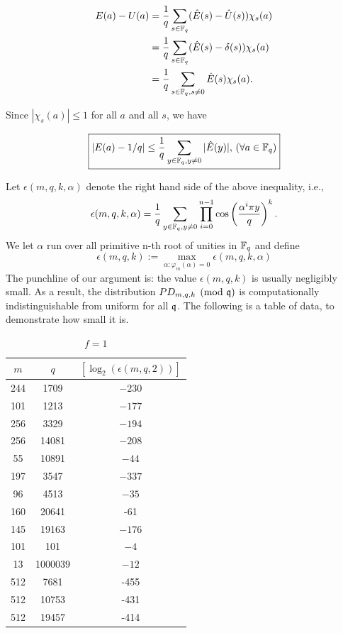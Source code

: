 \documentclass{amsart}
\begin{document}
\begin{align*}
    E(a) - U(a) &= \frac{1}{q} \sum_{s \in \mathbb{F}_q} (\hat{E}(s) - \hat{U}(s) )\chi_s(a) \\
& = \frac{1}{q} \sum_{s \in \mathbb{F}_q} (\hat{E}(s) - \delta(s) )\chi_s(a) \\
& = \frac{1}{q} \sum_{s \in \mathbb{F}_q, s \neq 0} \hat{E}(s) \chi_s(a).
\end{align*}

Since $|\chi_s(a)| \leq 1$ for all $a$ and all $s$, we have

\begin{Prop}
\[
    \boxed{|E(a) -  1/q| \leq \frac{1}{q}  \sum_{y \in \mathbb{F}_q, y \neq 0}  |\hat{E}(y)|, \, (\forall a \in \mathbb{F}_q)}
\]
\end{Prop}

Let $\epsilon(m,q,k,\alpha)$ denote the right hand side of the above inequality, i.e.,
\[
    \epsilon(m,q,k, \alpha) = \frac{1}{q}\sum_{y \in \mathbb{F}_q, y \neq 0} \prod_{i=0}^{n-1} \cos \left(\frac{ \alpha^i \pi y}{q} \right)^k.
\]
We let $\alpha$ run over all primitive n-th root of unities in $\mathbb{F}_q$ and define
$$\epsilon(m,q,k) := \max_{\alpha: \varphi_m(\alpha) = 0 } \epsilon(m,q,k,\alpha)$$
The punchline of our argument is: the value $\epsilon(m,q,k)$ is usually negligibly small. As a result, the distribution $PD_{m,q,k} \pmod {\mathfrak{q}}$ is computationally indistinguishable from uniform for all $\mathfrak{q}$. The following is a table of data, to demonstrate how small it is.

\FloatBarrier
\begin{table}[H]
\caption{$f = 1$}
\begin{tabular}{c|c|c}
$m$ & $q$ & $[\log_2(\epsilon(m,q, 2))]$ \\
\hline
244 & 1709 & $-230$ \\
101 & 1213 & $-177$ \\
256 & 3329 & $-194$ \\
256 & 14081 & $-208$ \\
55 & 10891  & $-44$ \\
197 & 3547 & $-337$ \\
96 & 4513 & $-35$ \\
160 & 20641 & -61 \\
145 & 19163 & $-176$ \\
101 & 101 & $-4$ \\
13 & 1000039 & $-12$ \\
512 & 7681 & -455  \\
512 & 10753 & -431 \\
512 & 19457 & -414
\end{tabular}
\end{table}
\end{document}
